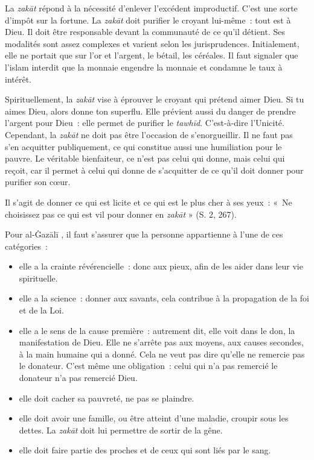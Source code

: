 La \emph{zakāt} répond à la nécessité d'enlever l'excédent improductif.
C'est une sorte d'impôt sur la fortune. La \emph{zakāt} doit purifier le
croyant lui-même~: tout est à Dieu. Il doit être responsable devant la
communauté de ce qu'il détient. Ses modalités sont assez complexes et
varient selon les jurisprudences. Initialement, elle ne portait que sur
l'or et l'argent, le bétail, les céréales. Il faut signaler que l'islam
interdit que la monnaie engendre la monnaie et condamne le taux à
intérêt.

Spirituellement, la \emph{zakāt} vise à éprouver le croyant qui prétend
aimer Dieu. Si tu aimes Dieu, alors donne ton superflu. Elle prévient
aussi du danger de prendre l'argent pour Dieu~: elle permet de purifier
le \emph{tawhīd}. C'est-à-dire l'Unicité. Cependant, la \emph{zakāt} ne
doit pas être l'occasion de s'enorgueillir. Il ne faut pas s'en
acquitter publiquement, ce qui constitue aussi une humiliation pour le
pauvre. Le véritable bienfaiteur, ce n'est pas celui qui donne, mais
celui qui reçoit, car il permet à celui qui donne de s'acquitter de ce
qu'il doit donner pour purifier son cœur.

Il s'agit de donner ce qui est licite et ce qui est le plus cher à ses
yeux~: «~Ne choisissez pas ce qui est vil pour donner en \emph{zakāt} »
(S. 2, 267).


Pour al-Ġazālī \label{theol:AlGazali15}, il faut s'assurer que la personne appartienne à l'une de
ces catégories~:

\begin{itemize}
\item
  elle a la crainte révérencielle~: donc aux pieux, afin de les aider
  dans leur vie spirituelle.
\item
  elle a la science~: donner aux savants, cela contribue à la
  propagation de la foi et de la Loi.
\item
  elle a le sens de la cause première~: autrement dit, elle voit dans le
  don, la manifestation de Dieu. Elle ne s'arrête pas aux moyens, aux
  causes secondes, à la main humaine qui a donné. Cela ne veut pas dire
  qu'elle ne remercie pas le donateur. C'est même une obligation~: celui
  qui n'a pas remercié le donateur n'a pas remercié Dieu.
\item
  elle doit cacher sa pauvreté, ne pas se plaindre.
\item
  elle doit avoir une famille, ou être atteint d'une maladie, croupir
  sous les dettes. La \emph{zakāt} doit lui permettre de sortir de la
  gêne.
\item
  elle doit faire partie des proches et de ceux qui sont liés par le
  sang.
\end{itemize}

